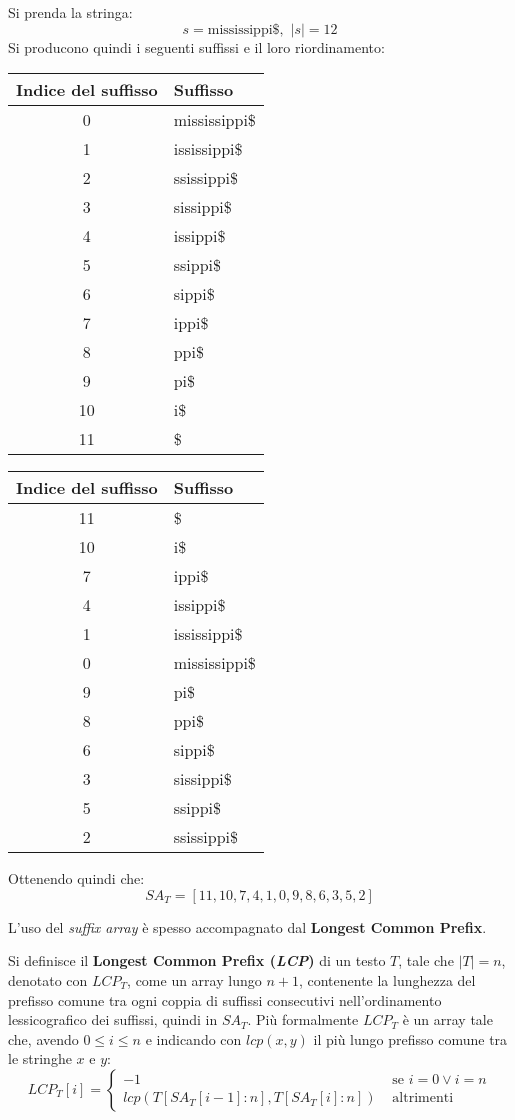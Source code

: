\begin{esempio}
  Si prenda la stringa:
  \[s=\mbox{mississippi\$},\,\,|s|=12\]
  Si producono quindi i seguenti suffissi e il loro riordinamento:
  \begin{table}[H]
    \footnotesize
    \centering
    \begin{tabular}{c|l}
      \textbf{Indice del suffisso} & \textbf{Suffisso}\\
      \hline
      0 & mississippi\$\\
      1 & ississippi\$\\
      2 & ssissippi\$\\
      3 & sissippi\$\\
      4 & issippi\$\\
      5 & ssippi\$\\
      6 & sippi\$\\
      7 & ippi\$\\
      8 & ppi\$\\
      9 & pi\$\\
      10 & i\$\\
      11 & \$\\
    \end{tabular}
    \quad
    \begin{tabular}{c|l} 
      \textbf{Indice del suffisso} & \textbf{Suffisso}\\ 
      \hline
      11 & \$\\
      10 & i\$\\
      7 & ippi\$\\
      4 & issippi\$\\
      1 & ississippi\$\\
      0 & mississippi\$\\
      9 & pi\$\\
      8 & ppi\$\\
      6 & sippi\$\\
      3 & sissippi\$\\
      5 & ssippi\$\\
      2 & ssissippi\$\\
    \end{tabular}
  \end{table}
  Ottenendo quindi che:
  \[SA_T=[11,10,7,4,1,0,9,8,6,3,5,2]\]
\end{esempio}
L'uso del \textit{suffix array} è spesso accompagnato dal \textbf{Longest Common
  Prefix}.
\begin{definizione}
  Si definisce il \textbf{Longest Common Prefix (\emph{LCP})} di un testo $T$,
  tale che $|T|=n$,
  denotato con $LCP_T$, come un array lungo $n+1$, contenente la
  lunghezza del prefisso comune tra ogni coppia di suffissi consecutivi
  nell'ordinamento lessicografico dei suffissi, quindi in $SA_T$. Più formalmente
  $LCP_T$ è un array tale che, avendo $0\leq i\leq n$ e indicando con $lcp(x,y)$
  il più lungo prefisso comune tra le stringhe $x$ e $y$:
  \[LCP_T[i]=
    \begin{cases}
      -1&\mbox{ se } i=0 \lor i=n\\
      lcp(T[SA_T[i-1]: n],T[SA_T [i]: n])&\mbox{ altrimenti}
    \end{cases}
  \]
\end{definizione}
